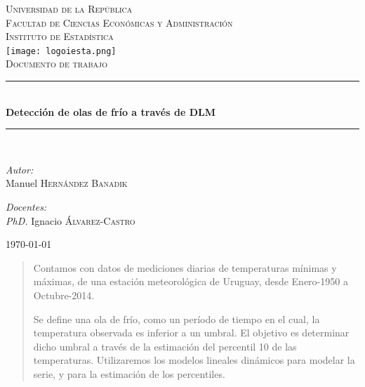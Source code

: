 \documentclass{article}
\newcommand{\HRule}{\rule{\linewidth}{0.5mm}}
\begin{document}
\begin{titlepage}
\begin{center}



\vspace*{\fill}
\textsc{\LARGE Universidad de la República}\\[1.5cm]

\textsc{\Large Facultad de Ciencias Económicas y Administración}\\[1.5cm]

\textsc{\large Instituto de Estadística}\\[1.5cm]

\texttt{[image: logoiesta.png]}~\\[1cm]

\textsc{\large Documento de trabajo}\\[0.5cm]


\HRule \\[0.4cm]
{\Large \bfseries Detección de olas de frío a través de DLM }

\HRule \\[1.5cm]

\begin{minipage}{0.4\textwidth}
\begin{flushleft}
\emph{Autor:}\\
Manuel \textsc{Hernández Banadik}
\\
\end{flushleft}
\end{minipage}
\begin{minipage}{0.4\textwidth}
\begin{flushright}
\emph{Docentes:} \\
\textit{PhD.} Ignacio \textsc{Álvarez-Castro}
\end{flushright}
\end{minipage}

\vfill

{\large \today}

\end{center}
\end{titlepage}\pagebreak


\tableofcontents
\listoffigures
\listoftables

\begin{abstract}

Contamos con datos de mediciones diarias de temperaturas mínimas y máximas, de una estación meteorológica de Uruguay, desde Enero-1950 a Octubre-2014.

Se define una ola de frío, como un período de tiempo en el cual, la temperatura observada es inferior a un umbral. El objetivo es determinar dicho umbral a través de la estimación del percentil 10 de las temperaturas. Utilizaremos los modelos lineales dinámicos para modelar la serie, y para la estimación de los percentiles.

\end{abstract}
\end{document}
